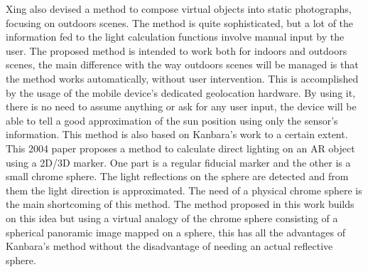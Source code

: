 Xing\cite{xing2013} also devised a method to compose virtual objects into static photographs, focusing on outdoors scenes. The method is quite sophisticated, but a lot of the information fed to the light calculation functions involve manual input by the user. The proposed method is intended to work both for indoors and outdoors scenes, the main difference with the way outdoors scenes will be managed is that the method works automatically, without user intervention. This is accomplished by the usage of the mobile device's dedicated geolocation hardware. By using it, there is no need to assume anything or ask for any user input, the device will be able to tell a good approximation of the sun position using only the sensor's information.\newline
This method is also based on Kanbara's work \cite{kanbara2004} to a certain extent. This 2004 paper proposes a method to calculate direct lighting on an AR object using a 2D/3D marker. One part is a regular fiducial marker and the other is a small chrome sphere. The light reflections on the sphere are detected and from them the light direction is approximated. The need of a physical chrome sphere is the main shortcoming of this method. The method proposed in this work builds on this idea but using a virtual analogy of the chrome sphere consisting of a spherical panoramic image mapped on a sphere, this has all the advantages of Kanbara's method without the disadvantage of needing an actual reflective sphere.